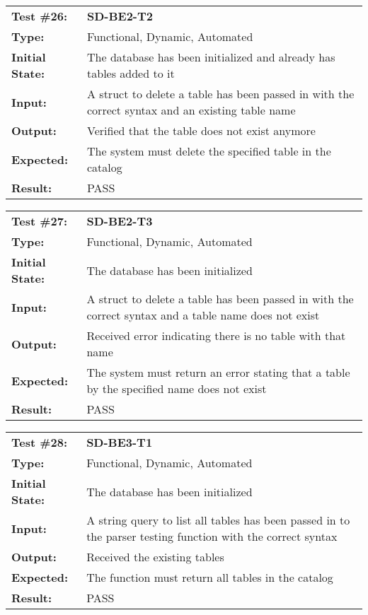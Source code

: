 \documentclass[12pt, titlepage]{article}
\begin{document}
\begin{mdframed}[linewidth=1pt]
\begin{tabularx}{\textwidth}{@{}p{3cm}X@{}}
{\bf Test \#26:} & {\bf SD-BE2-T2}\\[\baselineskip]
{\bf Type:} & Functional, Dynamic, Automated \\[0.5\baselineskip]
{\bf Initial State:} & The database has been initialized and already has tables added to it \\[\baselineskip]
{\bf Input:} & A struct to delete a table has been passed in with the correct syntax and an existing table name \\[\baselineskip]
{\bf Output:} & Verified that the table does not exist anymore \\[\baselineskip]
{\bf Expected:} & The system must delete the specified table in the catalog \\[\baselineskip]
{\bf Result:} & PASS
\end{tabularx}
\end{mdframed}

\begin{mdframed}[linewidth=1pt]
\begin{tabularx}{\textwidth}{@{}p{3cm}X@{}}
{\bf Test \#27:} & {\bf SD-BE2-T3}\\[\baselineskip]
{\bf Type:} & Functional, Dynamic, Automated \\[0.5\baselineskip]
{\bf Initial State:} & The database has been initialized \\[\baselineskip]
{\bf Input:} & A struct to delete a table has been passed in with the correct syntax and a table name does not exist \\[\baselineskip]
{\bf Output:} & Received error indicating there is no table with that name \\[\baselineskip]
{\bf Expected:} & The system must return an error stating that a table by the specified name does not exist \\[\baselineskip]
{\bf Result:} & PASS
\end{tabularx}
\end{mdframed}

\begin{mdframed}[linewidth=1pt]
\begin{tabularx}{\textwidth}{@{}p{3cm}X@{}}
{\bf Test \#28:} & {\bf SD-BE3-T1}\\[\baselineskip]
{\bf Type:} & Functional, Dynamic, Automated \\[0.5\baselineskip]
{\bf Initial State:} & The database has been initialized \\[\baselineskip]
{\bf Input:} & A string query to list all tables has been passed in to the parser testing function with the correct syntax \\[\baselineskip]
{\bf Output:} & Received the existing tables \\[\baselineskip]
{\bf Expected:} & The function must return all tables in the catalog \\[\baselineskip]
{\bf Result:} & PASS
\end{tabularx}
\end{mdframed} 
\end{document}
